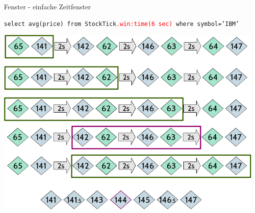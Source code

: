 \documentclass[usenames,dvipsnames]{beamer}
\begin{document}
\begin{frame}{Fenster - einfache Zeitfenster}

\begin{exampleblock}{}
    \begin{center}
        \texttt{select  avg(price) from StockTick\textcolor{red}{.win:time(6 sec)} where 
        symbol='IBM'}
    \end{center}
\end{exampleblock}

\begin{center}
    \includegraphics[scale=0.40]{img/solution-3}
\end{center}

\end{frame}
\end{document}
